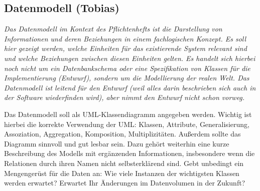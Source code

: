 \documentclass[fontsize=12pt,paper=a4,twoside]{scrartcl}
\begin{document}
\subsection{Datenmodell (Tobias)}
  {\em Das Datenmodell im Kontext des Pflichtenhefts ist {\glqq}die
  Darstellung von Informationen und deren Beziehungen in einem
  fachlogischen Konzept{\grqq}. Es soll hier gezeigt werden, welche
  Einheiten für das existierende System relevant sind und welche
  Beziehungen zwischen diesen Einheiten gelten. Es handelt sich
  hierbei noch nicht um ein Datenbankschema oder eine Spezifikation
  von Klassen für die Implementierung (Entwurf), sondern um die
  Modellierung der realen Welt. Das Datenmodell ist leitend für den
  Entwurf (weil alles darin beschrieben sich auch in der Software 
  wiederfinden wird), aber nimmt den Entwurf nicht schon vorweg.
  
  Das Datenmodell soll als UML-Klassendiagramm angegeben werden.
  Wichtig ist hierbei die korrekte Verwendung der UML: Klassen,
  Attribute, Generalisierung, Assoziation, Aggregation, Komposition,
  Multiplizitäten. Außerdem sollte das Diagramm sinnvoll und gut
  lesbar sein. Dazu gehört weiterhin eine kurze Beschreibung des
  Modells mit ergänzenden Informationen, insbesondere wenn die
  Relationen durch ihren Namen nicht selbsterklärend sind. Gebt
  unbedingt ein Mengengerüst für die Daten an: Wie viele Instanzen der
  wichtigsten Klassen werden erwartet? Erwartet Ihr Änderungen im
  Datenvolumen in der Zukunft?}
\end{document}
